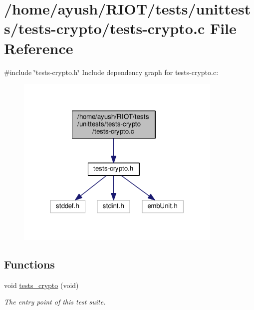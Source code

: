\hypertarget{tests-crypto_8c}{}\section{/home/ayush/\+R\+I\+O\+T/tests/unittests/tests-\/crypto/tests-\/crypto.c File Reference}
\label{tests-crypto_8c}
{\ttfamily \#include \char`\"{}tests-\/crypto.\+h\char`\"{}}\newline
Include dependency graph for tests-\/crypto.c\+:
\nopagebreak
\begin{figure}[H]
\begin{center}
\leavevmode
\includegraphics[width=280pt]{tests-crypto_8c__incl}
\end{center}
\end{figure}
\subsection*{Functions}
\begin{DoxyCompactItemize}
\item 
void \hyperlink{group__unittests_ga910f269e2fc5cd756415b49feb82eaca}{tests\+\_\+crypto} (void)
\begin{DoxyCompactList}\small\item\em The entry point of this test suite. \end{DoxyCompactList}\end{DoxyCompactItemize}
